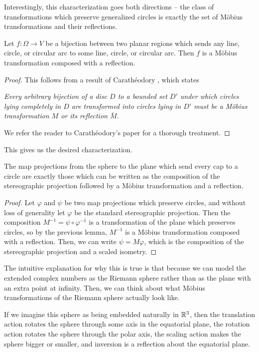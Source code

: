 Interestingly, this characterization goes both directions -- the class of transformations which preserve generalized circles is exactly the set of M\"obius transformations and their reflections.





\begin{lemma}
  Let $f:\Omega\to V$ be a bijection between two planar regions 
  which sends any line, circle, or circular arc to some line, circle, or circular arc. 
  Then $f$ is a M\"{o}bius transformation composed with a 
  reflection.
\end{lemma}
\begin{proof}
	
This follows from a result of
Carath\'{e}odory \cite{caratheodory}, which states

\begin{displayquote}
\textit{  Every arbitrary bijection of a disc $D$ to a bounded set $D'$ under which
  circles lying completely in $D$ are transformed into circles 
  lying in $D'$ must be a M\"obius transformation $M$ or its reflection $\bar M$.
}
\end{displayquote}

We refer the reader to Carath\'{e}odory's paper for a thorough treatment.

\end{proof}

This gives us the desired characterization.  


\begin{theorem}\label{thm:stereographic_mobius}
  The map projections from the sphere to the plane which send every
  cap to a circle are exactly those which can be written as the
  composition of the stereographic projection followed by a 
  M\"{o}bius transformation and a reflection.
\end{theorem}
\begin{proof}
  Let $\varphi$ and $\psi$ be two map projections which preserve
  circles, and without loss of generality let $\varphi$ be the
  standard stereographic projection.  Then the composition
  $M^{-1}=\psi\circ\varphi^{-1}$ is a transformation of 
  the plane which preserves circles, so by the previous lemma, 
  $M^{-1}$ is a M\"{o}bius transformation composed with a reflection. 
  Then, we can write $\psi= M\varphi$, which is the
  composition of the stereographic projection and a scaled isometry.
\end{proof}



The intuitive explanation for why this is true is that because we can model the extended complex numbers as the Riemann sphere rather than as the plane with an extra point at infinity.  Then, we can think about what M\"obius transformations of the Riemann sphere actually look like.  

If we imagine this sphere as being embedded naturally in $\mathbb{R}^3$, then the translation action rotates the sphere through some axis in the equatorial plane, the rotation action rotates the sphere through the polar axis, the scaling action makes the sphere bigger or smaller, and inversion is a reflection about the equatorial plane. 
